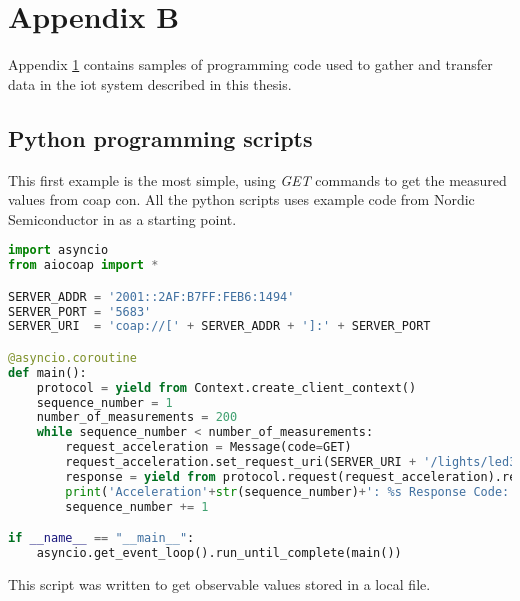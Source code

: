 \chapter{Appendix B}
\label{chp:appendix}

Appendix \ref{chp:appendix} contains samples of programming code used to gather and transfer data in the \gls{iot} system described in this thesis. 

\section{Python programming scripts}

This first example is the most simple, using \textit{GET} commands to get the measured values from \gls{coap} \gls{con}. All the python scripts uses example code from Nordic Semiconductor in \cite{nordicServerExamplePython} as a starting point. 

\begin{lstlisting}[language=Python]
import asyncio
from aiocoap import *

SERVER_ADDR = '2001::2AF:B7FF:FEB6:1494'
SERVER_PORT = '5683'
SERVER_URI  = 'coap://[' + SERVER_ADDR + ']:' + SERVER_PORT

@asyncio.coroutine
def main():
	protocol = yield from Context.create_client_context()
	sequence_number = 1
	number_of_measurements = 200
	while sequence_number < number_of_measurements:
		request_acceleration = Message(code=GET)
		request_acceleration.set_request_uri(SERVER_URI + '/lights/led3')
		response = yield from protocol.request(request_acceleration).response
		print('Acceleration'+str(sequence_number)+': %s Response Code: %s\n'%(response.payload, response.code))		
		sequence_number += 1

if __name__ == "__main__":
	asyncio.get_event_loop().run_until_complete(main())

\end{lstlisting}

\newpage

This script was written to get observable values stored in a local file. 


